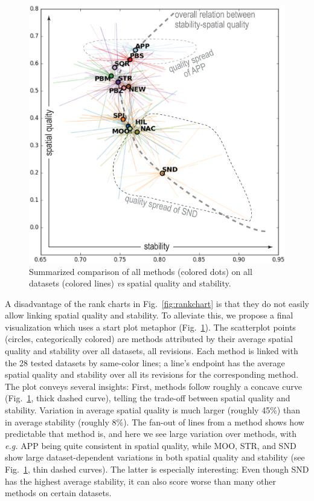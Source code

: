 \begin{figure}[htbp!]
\centering
\includegraphics[width=.85\linewidth]{figures/initial-treemap-evaluation/starplot.eps}
\vspace{-0.1cm}
\caption{Summarized comparison of all methods (colored dots) on all datasets (colored lines) \emph{vs} spatial quality and stability.}
\vspace{-0.2cm}
\label{fig:starplot}
\end{figure}

A disadvantage of the rank charts in Fig.~\ref{fig:rankchart} is that they do not easily allow linking spatial quality and stability. To alleviate this, we propose a final visualization which uses a start plot metaphor (Fig.~\ref{fig:starplot}). The scatterplot points (circles, categorically colored) are methods attributed by their average spatial quality and stability over all datasets, all revisions. Each method is linked with the 28 tested datasets by same-color lines; a line's endpoint has the average spatial quality and stability over all its revisions for the corresponding method. The plot conveys several insights: First, methods follow roughly a concave curve (Fig.~\ref{fig:starplot}, thick dashed curve), telling the trade-off between spatial quality and stability. Variation in average spatial quality is much larger (roughly 45\%) than in average stability (roughly 8\%). The fan-out of lines from a method shows how predictable that method is, and here we see large variation over methods, with \emph{e.g.} APP being quite consistent in spatial quality, while MOO, STR, and SND show large dataset-dependent variations in both spatial quality and stability (see Fig.~\ref{fig:starplot}, thin dashed curves). The latter is especially interesting: Even though SND has the highest average stability, it can also score worse than many other methods on certain datasets.


